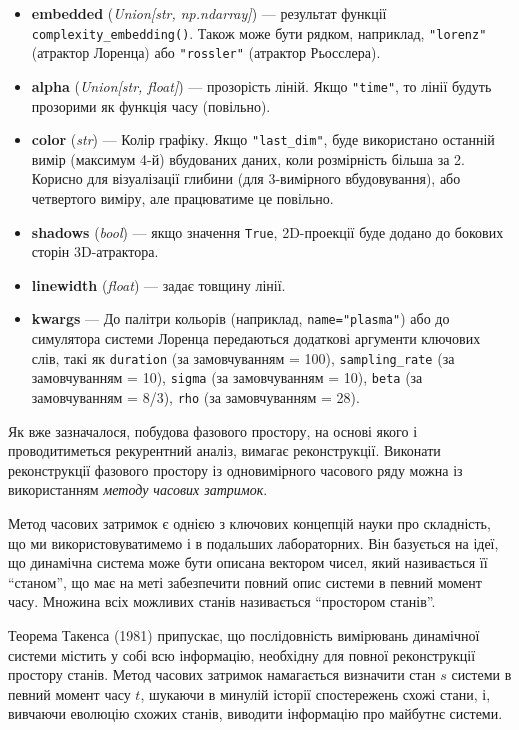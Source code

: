 \documentclass[
  letterpaper,
]{report}
\providecommand{\tightlist}{%
  \setlength{\itemsep}{0pt}\setlength{\parskip}{0pt}}\usepackage{longtable,booktabs,array}
\begin{document}
\begin{itemize}
\tightlist
\item
  \textbf{embedded} (\emph{Union{[}str, np.ndarray{]}}) --- результат
  функції \texttt{complexity\_embedding()}. Також може бути рядком,
  наприклад, \texttt{"lorenz"} (атрактор Лоренца) або \texttt{"rossler"}
  (атрактор Рьосслера).
\item
  \textbf{alpha} (\emph{Union{[}str, float{]}}) --- прозорість ліній.
  Якщо \texttt{"time"}, то лінії будуть прозорими як функція часу
  (повільно).
\item
  \textbf{color} (\emph{str}) --- Колір графіку. Якщо
  \texttt{"last\_dim"}, буде використано останній вимір (максимум 4-й)
  вбудованих даних, коли розмірність більша за 2. Корисно для
  візуалізації глибини (для 3-вимірного вбудовування), або четвертого
  виміру, але працюватиме це повільно.
\item
  \textbf{shadows} (\emph{bool}) --- якщо значення \texttt{True},
  2D-проекції буде додано до бокових сторін 3D-атрактора.
\item
  \textbf{linewidth} (\emph{float}) --- задає товщину лінії.
\item
  \textbf{kwargs} --- До палітри кольорів (наприклад,
  \texttt{name="plasma"}) або до симулятора системи Лоренца передаються
  додаткові аргументи ключових слів, такі як \texttt{duration} (за
  замовчуванням = 100), \texttt{sampling\_rate} (за замовчуванням = 10),
  \texttt{sigma} (за замовчуванням = 10), \texttt{beta} (за
  замовчуванням = 8/3), \texttt{rho} (за замовчуванням = 28).
\end{itemize}

Як вже зазначалося, побудова фазового простору, на основі якого і
проводитиметься рекурентний аналіз, вимагає реконструкції. Виконати
реконструкції фазового простору із одновимірного часового ряду можна із
використанням \emph{методу часових затримок}.

Метод часових затримок є однією з ключових концепцій науки про
складність, що ми використовуватимемо і в подальших лабораторних. Він
базується на ідеї, що динамічна система може бути описана вектором
чисел, який називається її ``станом'', що має на меті забезпечити повний
опис системи в певний момент часу. Множина всіх можливих станів
називається ``простором станів''.

Теорема Такенса (1981) припускає, що послідовність вимірювань динамічної
системи містить у собі всю інформацію, необхідну для повної
реконструкції простору станів. Метод часових затримок намагається
визначити стан \(s\) системи в певний момент часу \(t\), шукаючи в
минулій історії спостережень схожі стани, і, вивчаючи еволюцію схожих
станів, виводити інформацію про майбутнє системи.
\end{document}

